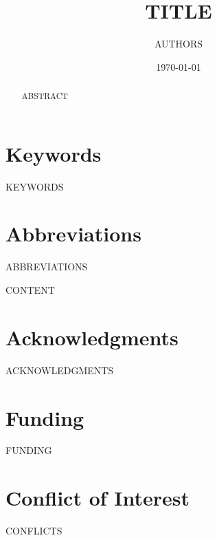 \documentclass[11pt,a4paper]{article}
\title{{{TITLE}}}
\author{{{AUTHORS}}}
\date{\today}
\begin{document}
\maketitle

\begin{abstract}
{{ABSTRACT}}
\end{abstract}

\section*{Keywords}
{{KEYWORDS}}

\section*{Abbreviations}
{{ABBREVIATIONS}}

{{CONTENT}}

\section*{Acknowledgments}
{{ACKNOWLEDGMENTS}}

\section*{Funding}
{{FUNDING}}

\section*{Conflict of Interest}
{{CONFLICTS}}



\end{document}
